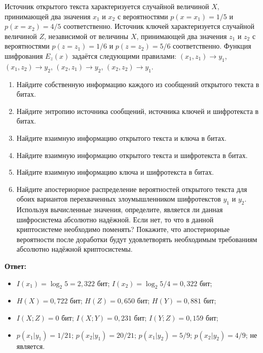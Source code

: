 \tasknumber Источник открытого текста характеризуется случайной величиной $X$, принимающей два значения $x_1$ и $x_2$ с вероятностями $p \left( x = x_1 \right) = 1/5$ и $p \left( x = x_2 \right) = 4/5$ соответственно. Источник ключей характеризуется случайной величиной $Z$, независимой от величины $X$, принимающей два значения $z_1$ и $z_2$ с вероятностями $p \left( z = z_1 \right) = 1/6$ и $p \left( z = z_2 \right) = 5/6$ соответственно. Функция шифрования $E_{z} \left( x \right)$ задаётся следующими правилами: $\left( x_1, z_1 \right) \to y_1$, $\left( x_1, z_2 \right) \to y_2$, $\left( x_2, z_1 \right) \to y_2$, $\left( x_2, z_2 \right) \to y_1$.
\begin{enumerate}\itemsep1pt \parskip0pt 
	\item Найдите собственную информацию каждого из сообщений открытого текста в битах.
	\item Найдите энтропию источника сообщений, источника ключей и шифротекста в битах.
	\item Найдите взаимную информацию открытого текста и ключа в битах.
	\item Найдите взаимную информацию открытого текста и шифротекста в битах.
	\item Найдите взаимную информацию ключа и шифротекста в битах.
	\item Найдите апостериорное распределение вероятностей открытого текста для обоих вариантов перехваченных злоумышленником шифротекстов $y_1$ и $y_2$. Используя вычисленные значения, определите, является ли данная шифросистема абсолютно надёжной. Если нет, то что в данной криптосистеме необходимо поменять? Покажите, что апостериорные вероятности после доработки будут удовлетворять необходимым требованиям абсолютно надёжной криптосистемы.
\end{enumerate}
\medbreak
\textbf{Ответ:}
\begin{itemize}\itemsep1pt \parskip0pt 
	\item $I \left( x_1 \right) = \log_2 5 = 2,322$ бит; $I \left( x_2 \right) = \log_2 5/4 = 0,322$ бит;
	\item $H \left( X \right) = 0,722$ бит; $H \left( Z \right) = 0,650$ бит; $H \left( Y \right) = 0,881$ бит;
	\item $I \left( X ; Z \right) = 0$ бит; $I \left( X; Y \right) = 0,231$ бит; $I \left( Y; Z \right) = 0,159$ бит;
	\item $p \left( x_1 | y_1 \right) = 1/21$; $p \left( x_2 | y_1 \right) = 20/21$; $p \left( x_1 | y_2 \right) = 5/9$; $p \left( x_2 | y_2 \right) = 4/9$; не является.
\end{itemize}

